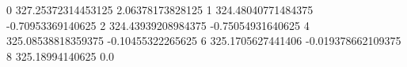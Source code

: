 0 327.25372314453125 2.06378173828125
1 324.48040771484375 -0.70953369140625
2 324.43939208984375 -0.75054931640625
4 325.08538818359375 -0.10455322265625
6 325.1705627441406 -0.019378662109375
8 325.18994140625 0.0
